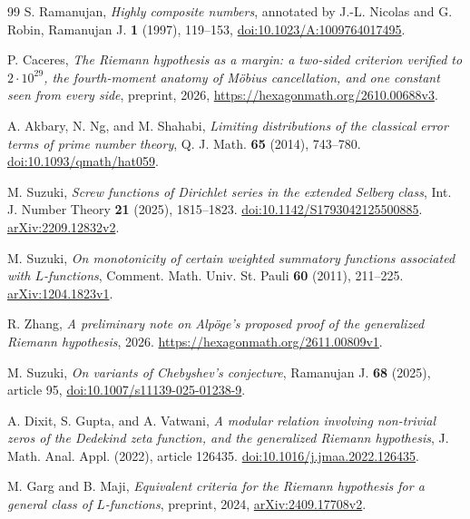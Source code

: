 \documentclass[11pt]{amsart}
\theoremstyle{definition}
\theoremstyle{remark}
\numberwithin{equation}{section}
\begin{document}
\begin{thebibliography}{99}
S. Ramanujan,
\emph{Highly composite numbers},
annotated by J.-L. Nicolas and G. Robin,
Ramanujan J. \textbf{1} (1997), 119--153,
\href{https://doi.org/10.1023/A:1009764017495}
{doi:10.1023/A:1009764017495}.

P. Caceres,
\emph{The Riemann hypothesis as a margin: a two-sided criterion
verified to \(2\cdot10^{29}\), the fourth-moment anatomy of
M\"obius cancellation, and one constant seen from every side},
preprint, 2026, \url{https://hexagonmath.org/2610.00688v3}.

A. Akbary, N. Ng, and M. Shahabi,
\emph{Limiting distributions of the classical error terms of prime
number theory}, Q. J. Math. \textbf{65} (2014), 743--780.
\href{https://doi.org/10.1093/qmath/hat059}{doi:10.1093/qmath/hat059}.

M. Suzuki,
\emph{Screw functions of Dirichlet series in the extended Selberg class},
Int. J. Number Theory \textbf{21} (2025), 1815--1823.
\href{https://doi.org/10.1142/S1793042125500885}{doi:10.1142/S1793042125500885}.
\href{https://arxiv.org/abs/2209.12832v2}{arXiv:2209.12832v2}.

M. Suzuki,
\emph{On monotonicity of certain weighted summatory functions
associated with \(L\)-functions},
Comment. Math. Univ. St. Pauli \textbf{60} (2011), 211--225.
\href{https://arxiv.org/abs/1204.1823v1}{arXiv:1204.1823v1}.

R. Zhang,
\emph{A preliminary note on Alp\"oge's proposed proof of the
generalized Riemann hypothesis}, 2026.
\url{https://hexagonmath.org/2611.00809v1}.

M. Suzuki,
\emph{On variants of Chebyshev's conjecture},
Ramanujan J. \textbf{68} (2025), article 95,
\href{https://doi.org/10.1007/s11139-025-01238-9}{doi:10.1007/s11139-025-01238-9}.

A. Dixit, S. Gupta, and A. Vatwani,
\emph{A modular relation involving non-trivial zeros of the Dedekind
zeta function, and the generalized Riemann hypothesis},
J. Math. Anal. Appl. (2022), article 126435.
\href{https://doi.org/10.1016/j.jmaa.2022.126435}{doi:10.1016/j.jmaa.2022.126435}.

M. Garg and B. Maji,
\emph{Equivalent criteria for the Riemann hypothesis for a general
class of \(L\)-functions},
preprint, 2024,
\href{https://arxiv.org/abs/2409.17708v2}{arXiv:2409.17708v2}.


\end{thebibliography}
\end{document}
